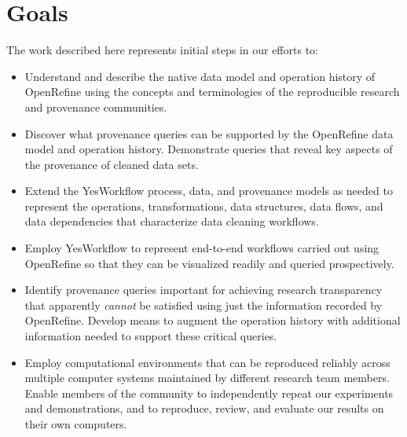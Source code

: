 \section{Goals}

The work described here represents initial steps in our efforts to:

\begin{itemize}[label=\raisebox{0.25ex}{\tiny$\bullet$}]

\item Understand and describe the native data model and operation history of OpenRefine using the concepts and terminologies of the reproducible research and provenance communities.

\item Discover what provenance queries can be supported by the OpenRefine data model and operation history.  Demonstrate queries that reveal key aspects of the provenance of cleaned data sets.

\item Extend the YesWorkflow \cite{mcphillips2015yesworkflowa} process, data, and provenance models as needed to represent the operations, transformations, data structures, data flows, and data dependencies that characterize data cleaning workflows.  

\item Employ YesWorkflow to represent end-to-end workflows carried out using OpenRefine so that they can be visualized readily and queried prospectively.

\item Identify provenance queries important for achieving research transparency that apparently \emph{cannot} be satisfied using just the information recorded by OpenRefine. Develop means to augment the operation history with additional information needed to support these critical queries.

\item Employ computational environments that can be reproduced reliably across multiple computer systems maintained by different research team members. Enable members of the community to independently repeat our experiments and demonstrations, and to reproduce, review, and evaluate our results on their own computers.

\end{itemize}

